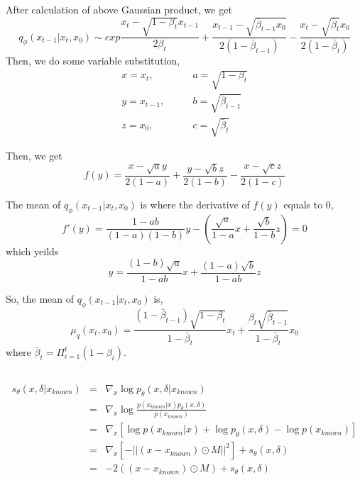 \documentclass[12pt]{article}
\begin{document}
After calculation of above Gaussian product, we get
\begin{equation}
    q_\phi(x_{t-1} | x_t, x_0) \sim exp{\frac{x_t - \sqrt{1-\beta_t}x_{t-1}}{2\beta_t} + \frac{x_{t-1} - \sqrt{\bar{\beta}_{t-1}x_0}}{2(1-\bar{\beta}_{t-1})} - \frac{x_t - \sqrt{\bar{\beta}_{t}}x_0}{2(1-\bar{\beta}_{t})}} \nonumber 
\end{equation}
Then, we do some variable substitution,
\begin{align}
    x = x_{t}, \quad\quad & a = \sqrt{1-\beta_t} \nonumber \\
    y = x_{t-1}, \quad\quad & b = \sqrt{\bar{\beta}_{t-1}} \nonumber\\
    z = x_0, \quad\quad& c = \sqrt{\bar{\beta}_{t}} \nonumber
\end{align}

Then, we get
\begin{equation}
    f(y) = \frac{x - \sqrt{a}y}{2(1-a)} + \frac{y - \sqrt{b}z}{2(1-b)} - \frac{x - \sqrt{c}z}{2(1-c)} \nonumber
\end{equation}

The mean of $q_\phi(x_{t-1} | x_t, x_0)$ is where the derivative of $f(y)$ equals to 0,
\begin{equation}
    f'(y) = \frac{1-ab}{(1-a)(1-b)}y - (\frac{\sqrt{a}}{1-a}x + \frac{\sqrt{b}}{1-b}z) = 0 \nonumber
\end{equation}
which yeilds
\begin{equation}
    y = \frac{(1-b)\sqrt{a}}{1-ab}x + \frac{(1-a)\sqrt{b}}{1-ab}z \nonumber
\end{equation}

So, the mean of $q_\phi(x_{t-1} | x_t, x_0)$ is,
\begin{equation}
    \mu_q(x_t, x_0) = \frac{(1-\bar{\beta}_{t-1})\sqrt{1 - \beta_t}}{1 - \bar{\beta}_t}x_t + \frac{\beta_t \sqrt{\bar{\beta}_{t-1}}}{1-\bar{\beta}_t}x_0 \nonumber
\end{equation}
where $\bar{\beta}_t = \Pi_{i=1}^{t}(1-\beta_i)$.

\subsection{}
\begin{eqnarray}
    s_\theta(x, \delta | x_{known}) & = & \nabla_{x} \log p_\theta(x , \delta | x_{known}) \nonumber \\
    & = & \nabla_{x} \log \frac{p(x_{known}|x) p_\theta(x, \delta)}{p(x_{known})} \nonumber \\
    & = & \nabla_{x}[\log p(x_{known}|x) + \log p_\theta(x, \delta) - \log p(x_{known})] \nonumber \\
    & = & \nabla_{x}[-||(x - x_{known}) \odot M ||^2] + s_\theta(x, \delta) \nonumber \\
    & = & -2((x - x_{known}) \odot M )+ s_\theta(x, \delta) \nonumber
\end{eqnarray}
\end{document}
